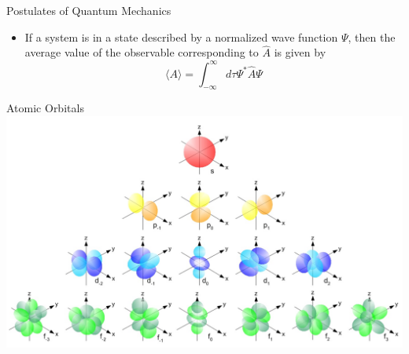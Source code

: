 \documentclass[11pt]{beamer}
\begin{document}
\begin{frame}{Postulates of Quantum Mechanics}
  \begin{itemize}
  \item If a system is in a state described by a normalized wave function $\Psi$,
    then the average value of the observable corresponding to $\hat{A}$ is given by
    \begin{equation}
      \langle A \rangle = \int^\infty_{-\infty} d\tau \Psi^*\hat{A}\Psi
    \end{equation}
  \end{itemize}
\end{frame}

\begin{frame}{Atomic Orbitals}
  \centering
  \includegraphics[width=\linewidth]{single_elect_orb}
\end{frame}
\end{document}
